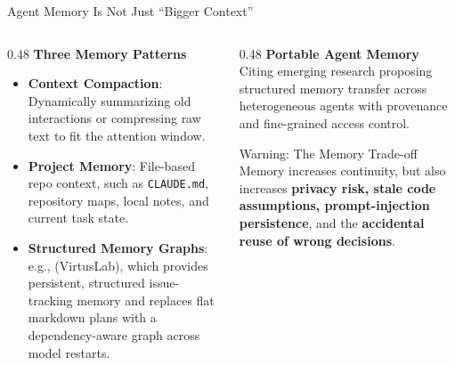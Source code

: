 \begin{frame}{Agent Memory Is Not Just ``Bigger Context''}
  \begin{columns}[T, onlytextwidth]
    \begin{column}{0.48\textwidth}
      \textbf{Three Memory Patterns}\\[0.3em]
      \begin{itemize}
        \item \textbf{Context Compaction}: Dynamically summarizing old interactions or compressing raw text to fit the attention window.
        \item \textbf{Project Memory}: File-based repo context, such as \texttt{CLAUDE.md}, repository maps, local notes, and current task state.
        \item \textbf{Structured Memory Graphs}: e.g.,  (VirtusLab), which provides persistent, structured issue-tracking memory and replaces flat markdown plans with a dependency-aware graph across model restarts.
      \end{itemize}
    \end{column}
    \hfill
    \begin{column}{0.48\textwidth}
      \textbf{Portable Agent Memory}\\[0.3em]
      Citing emerging research proposing structured memory transfer across heterogeneous agents with provenance and fine-grained access control.
      \vspace{0.4em}
      \begin{alertblock}{Warning: The Memory Trade-off}
        Memory increases continuity, but also increases \textbf{privacy risk, stale code assumptions, prompt-injection persistence}, and the \textbf{accidental reuse of wrong decisions}.
      \end{alertblock}
    \end{column}
  \end{columns}
\end{frame}

